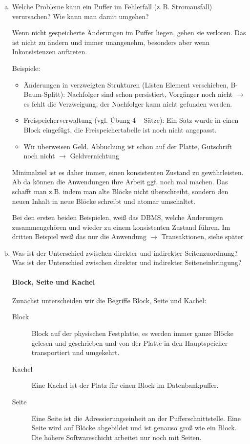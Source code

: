 \begin{enumerate}[a)]
	\item Welche Probleme kann ein Puffer im Fehlerfall (z.\,B. Stromausfall) verursachen? Wie kann man damit umgehen?

	\begin{solution}
	Wenn nicht gespeicherte Änderungen im Puffer liegen, gehen sie verloren. Das ist nicht zu ändern und immer unangenehm, besonders aber wenn Inkonsistenzen auftreten.

	Beispiele:
	\begin{itemize}
		\item Änderungen in verzweigten Strukturen (Listen Element verschieben, B-Baum-Splitt): Nachfolger sind schon persistiert, Vorgänger noch nicht $\rightarrow$ es fehlt die Verzweigung, der Nachfolger kann nicht gefunden werden.
		\item Freispeicherverwaltung (vgl. Übung 4 -- Sätze): Ein Satz wurde in einen Block eingefügt, die Freispeichertabelle ist noch nicht angepasst.
		\item Wir überweisen Geld. Abbuchung ist schon auf der Platte, Gutschrift noch nicht $\rightarrow$ Geldvernichtung
	\end{itemize}
	Minimalziel ist es daher immer, einen konsistenten Zustand zu gewährleisten. Ab da können die Anwendungen ihre Arbeit ggf. noch mal machen. Das schafft man z.B. indem man alte Blöcke nicht überschreibt, sondern den neuen Inhalt in neue Blöcke schreibt und atomar umschaltet.

	Bei den ersten beiden Beispielen, weiß das DBMS, welche Änderungen zusammengehören und wieder zu einem konsistenten Zustand führen. Im dritten Beispiel weiß das nur die Anwendung $\rightarrow$ Transaktionen, siehe später
	\end{solution}


	\item Was ist der Unterschied zwischen direkter und indirekter Seitenzuordnung? Was ist der Unterschied zwischen direkter und indirekter Seiteneinbringung?

	\begin{solution}

	\paragraph{Block, Seite und Kachel}
	Zunächst unterscheiden wir die Begriffe Block, Seite und Kachel:
	\begin{description}
		\item[Block] Block auf der physischen Festplatte, es werden immer ganze Blöcke gelesen und geschrieben und von der Platte in den Hauptspeicher transportiert und umgekehrt.
		\item[Kachel] Eine Kachel ist der Platz für einen Block im Datenbankpuffer. %
		\item[Seite] Eine Seite ist die Adressierungseinheit an der Pufferschnittstelle. Eine Seite wird auf Blöcke abgebildet und ist genauso groß wie ein Block. Die höhere Softwareschicht arbeitet nur noch mit Seiten.
	\end{description}



\end{solution}
\end{enumerate}
